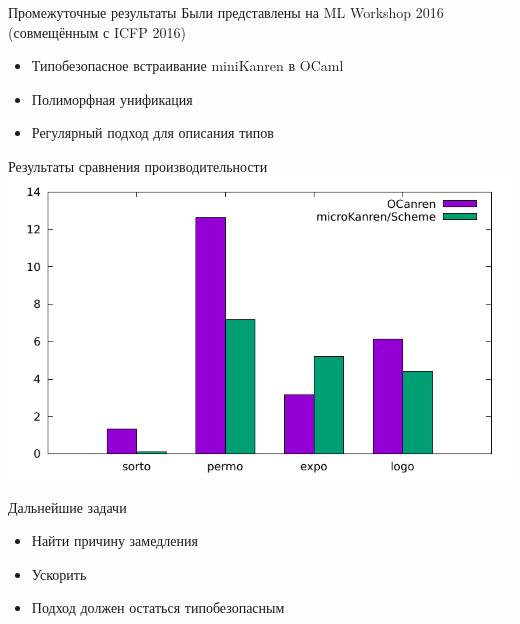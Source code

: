 \documentclass[10pt, mathserif]{beamer}
\theoremstyle{definition}
\begin{document}
\begin{frame}[fragile]{Промежуточные результаты}
Были представлены на ML Workshop 2016 (совмещённым с ICFP 2016)
\begin{itemize}
\item Типобезопасное встраивание miniKanren в OCaml
\item Полиморфная унификация
\item Регулярный подход для описания типов
\end{itemize}

\end{frame}

% 
\begin{frame}{Результаты сравнения производительности}
\centering
\includegraphics[scale=0.85]{histo1.pdf}
\end{frame}

\begin{frame}[fragile]{Дальнейшие задачи}
  \begin{itemize}
  \item Найти причину замедления
  \item Ускорить
  \item Подход должен остаться типобезопасным
  \end{itemize}

\end{frame}


\end{document}
